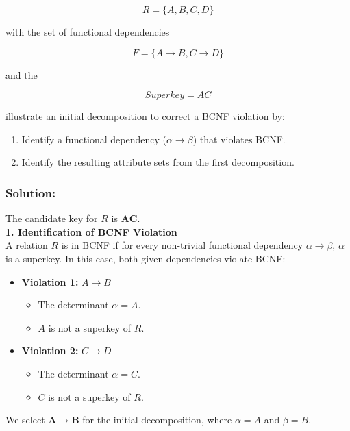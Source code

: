 \documentclass{article}
\begin{document}
$$R = \{A, B, C, D\}$$

with the set of functional dependencies

$$F = \{ A \rightarrow B, C \rightarrow D \}$$

and the

$$Superkey = AC$$

illustrate an initial decomposition to correct a BCNF violation by:

\begin{enumerate}
    \item Identify a functional dependency ($\alpha \rightarrow \beta$) that violates BCNF.
    \item Identify the resulting attribute sets from the first decomposition.
\end{enumerate}

\subsubsection*{Solution:}
The candidate key for $R$ is $\mathbf{AC}$. \\

\textbf{1. Identification of BCNF Violation} \\

A relation $R$ is in BCNF if for every non-trivial functional dependency $\alpha \rightarrow \beta$, $\alpha$ is a superkey. In this case, both given dependencies violate BCNF:

\begin{itemize}
    \item \textbf{Violation 1:} $A \rightarrow B$
        \begin{itemize}
            \item The determinant $\alpha = A$.
            \item $A$ is not a superkey of $R$.
        \end{itemize}
    \item \textbf{Violation 2:} $C \rightarrow D$
        \begin{itemize}
            \item The determinant $\alpha = C$.
            \item $C$ is not a superkey of $R$.
        \end{itemize}
\end{itemize}

We select $\mathbf{A \rightarrow B}$ for the initial decomposition, where $\alpha=A$ and $\beta=B$. \\
\end{document}
